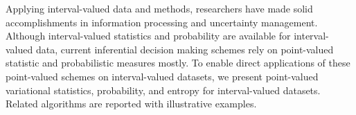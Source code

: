
Applying interval-valued data and methods, researchers have made solid accomplishments in  information processing and  uncertainty management. Although interval-valued statistics and probability are available for interval-valued data, current inferential decision making schemes rely on point-valued statistic and probabilistic measures mostly.  To enable direct applications of these point-valued schemes on interval-valued datasets, we present point-valued variational statistics, probability, and entropy for interval-valued datasets.  Related algorithms are reported with illustrative examples.  

